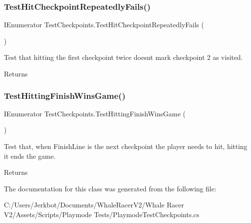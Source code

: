 \subsubsection{\texorpdfstring{Test\+Hit\+Checkpoint\+Repeatedly\+Fails()}{TestHitCheckpointRepeatedlyFails()}}
{\footnotesize\ttfamily I\+Enumerator Test\+Checkpoints.\+Test\+Hit\+Checkpoint\+Repeatedly\+Fails (\begin{DoxyParamCaption}{ }\end{DoxyParamCaption})}



Test that hitting the first checkpoint twice doesn\textquotesingle{}t mark checkpoint 2 as visited. 

\begin{DoxyReturn}{Returns}

\end{DoxyReturn}
\mbox{\label{class_test_checkpoints_a96497243b0586c2eb5a98cc359079a29}} 
\subsubsection{\texorpdfstring{Test\+Hitting\+Finish\+Wins\+Game()}{TestHittingFinishWinsGame()}}
{\footnotesize\ttfamily I\+Enumerator Test\+Checkpoints.\+Test\+Hitting\+Finish\+Wins\+Game (\begin{DoxyParamCaption}{ }\end{DoxyParamCaption})}



Test that, when Finish\+Line is the next checkpoint the player needs to hit, hitting it ends the game. 

\begin{DoxyReturn}{Returns}

\end{DoxyReturn}


The documentation for this class was generated from the following file\+:\begin{DoxyCompactItemize}
\item 
C\+:/\+Users/\+Jerkbot/\+Documents/\+Whale\+Racer\+V2/\+Whale Racer V2/\+Assets/\+Scripts/\+Playmode Tests/Playmode\+Test\+Checkpoints.\+cs\end{DoxyCompactItemize}
